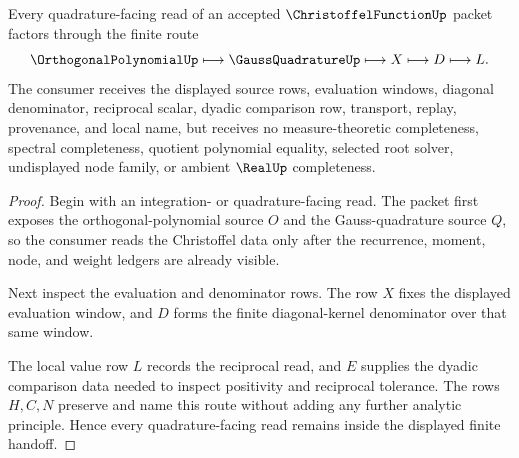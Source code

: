 \begin{theorem}
\label{thm:christoffel-function-quadrature-handoff}
Every quadrature-facing read of an accepted $\ChristoffelFunctionUp$ packet factors through the finite route
$$
\OrthogonalPolynomialUp \longmapsto \GaussQuadratureUp \longmapsto X \longmapsto D \longmapsto L .
$$
The consumer receives the displayed source rows, evaluation windows, diagonal denominator, reciprocal scalar, dyadic comparison row, transport, replay, provenance, and local name, but receives no measure-theoretic completeness, spectral completeness, quotient polynomial equality, selected root solver, undisplayed node family, or ambient $\RealUp$ completeness.
\end{theorem}
\begin{proof}
Begin with an integration- or quadrature-facing read. The packet first exposes the orthogonal-polynomial source $O$ and the Gauss-quadrature source $Q$, so the consumer reads the Christoffel data only after the recurrence, moment, node, and weight ledgers are already visible.

Next inspect the evaluation and denominator rows. The row $X$ fixes the displayed evaluation window, and $D$ forms the finite diagonal-kernel denominator over that same window.

The local value row $L$ records the reciprocal read, and $E$ supplies the dyadic comparison data needed to inspect positivity and reciprocal tolerance. The rows $H,C,N$ preserve and name this route without adding any further analytic principle. Hence every quadrature-facing read remains inside the displayed finite handoff.
\end{proof}



